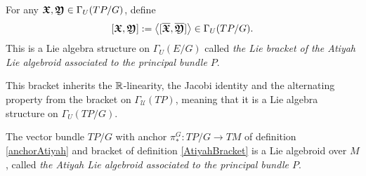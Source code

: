 \begin{definition}\label{AtiyahBracket}
For any $\bm{\mathfrak{X}}, \bm{\mathfrak{Y}} \in \Gamma_U(TP/G)$, define 
\begin{align} \label{bracketDefn}
    [\bm{\mathfrak{X}}, \bm{\mathfrak{Y}}] := \left\langle [\overline{\bm{\bm{\mathfrak{X}}}}, \overline{\bm{\bm{\mathfrak{Y}}}}] \right\rangle \in \Gamma_U(TP/G).
\end{align}
This is a Lie algebra structure on $\Gamma_U(E/G)$ called \emph{the Lie bracket of the Atiyah Lie algebroid associated to the principal bundle $P$}.
\end{definition}

This bracket inherits the $\mathbb{R}$-linearity, the Jacobi identity and the alternating property from the bracket on $\Gamma_{\mathcal U}(TP)$, meaning that it is a Lie algebra structure on $\Gamma_U(TP/G)$.

\begin{theorem}
The vector bundle $TP/G$ with anchor $\pi_*^G:TP/G \to TM$ of definition \ref{anchorAtiyah} and bracket of definition \ref{AtiyahBracket} is a Lie algebroid over $M$, called \emph{the Atiyah Lie algebroid associated to the principal bundle $P$}.
\end{theorem}

